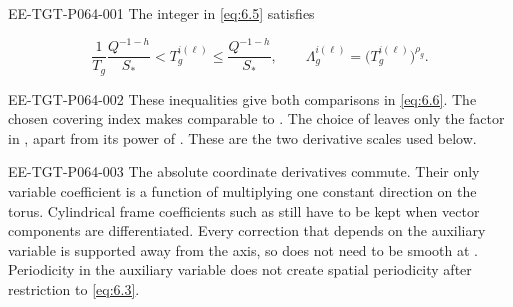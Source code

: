 %
\begin{EESegment}{EE-TGT-P064-001}
The integer  in \eqref{eq:6.5} satisfies
\end{EESegment}
\[
 \frac1{T_g}\frac{Q^{-1-h}}{S_*}<T_g^{i(\ell)}\le\frac{Q^{-1-h}}{S_*},
 \qquad
 \Lambda_g^{i(\ell)}=\bigl(T_g^{i(\ell)}\bigr)^{\rho_g}.
\]
\begin{EESegment}{EE-TGT-P064-002}
These inequalities give both comparisons in \eqref{eq:6.6}. The chosen covering index makes  comparable to . The choice of  leaves only the factor  in , apart from its power of . These are the two derivative scales used below.
\end{EESegment}

\begin{EESegment}{EE-TGT-P064-003}
The absolute coordinate derivatives  commute. Their only variable coefficient is a function of  multiplying one constant direction on the torus. Cylindrical frame coefficients such as  still have to be kept when vector components are differentiated. Every correction that depends on the auxiliary variable is supported away from the axis, so  does not need to be smooth at . Periodicity in the auxiliary variable does not create spatial periodicity after restriction to \eqref{eq:6.3}.
\end{EESegment}

